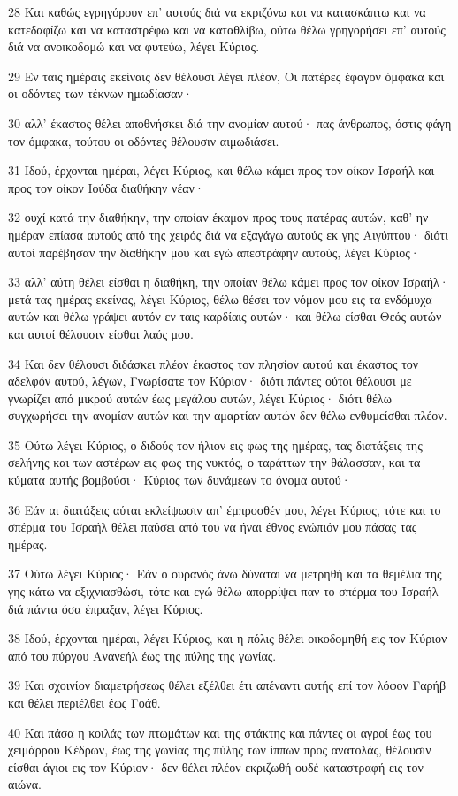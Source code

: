 \par 28 Και καθώς εγρηγόρουν επ' αυτούς διά να εκριζόνω και να κατασκάπτω και να κατεδαφίζω και να καταστρέφω και να καταθλίβω, ούτω θέλω γρηγορήσει επ' αυτούς διά να ανοικοδομώ και να φυτεύω, λέγει Κύριος.
\par 29 Εν ταις ημέραις εκείναις δεν θέλουσι λέγει πλέον, Οι πατέρες έφαγον όμφακα και οι οδόντες των τέκνων ημωδίασαν·
\par 30 αλλ' έκαστος θέλει αποθνήσκει διά την ανομίαν αυτού· πας άνθρωπος, όστις φάγη τον όμφακα, τούτου οι οδόντες θέλουσιν αιμωδιάσει.
\par 31 Ιδού, έρχονται ημέραι, λέγει Κύριος, και θέλω κάμει προς τον οίκον Ισραήλ και προς τον οίκον Ιούδα διαθήκην νέαν·
\par 32 ουχί κατά την διαθήκην, την οποίαν έκαμον προς τους πατέρας αυτών, καθ' ην ημέραν επίασα αυτούς από της χειρός διά να εξαγάγω αυτούς εκ γης Αιγύπτου· διότι αυτοί παρέβησαν την διαθήκην μου και εγώ απεστράφην αυτούς, λέγει Κύριος·
\par 33 αλλ' αύτη θέλει είσθαι η διαθήκη, την οποίαν θέλω κάμει προς τον οίκον Ισραήλ· μετά τας ημέρας εκείνας, λέγει Κύριος, θέλω θέσει τον νόμον μου εις τα ενδόμυχα αυτών και θέλω γράψει αυτόν εν ταις καρδίαις αυτών· και θέλω είσθαι Θεός αυτών και αυτοί θέλουσιν είσθαι λαός μου.
\par 34 Και δεν θέλουσι διδάσκει πλέον έκαστος τον πλησίον αυτού και έκαστος τον αδελφόν αυτού, λέγων, Γνωρίσατε τον Κύριον· διότι πάντες ούτοι θέλουσι με γνωρίζει από μικρού αυτών έως μεγάλου αυτών, λέγει Κύριος· διότι θέλω συγχωρήσει την ανομίαν αυτών και την αμαρτίαν αυτών δεν θέλω ενθυμείσθαι πλέον.
\par 35 Ούτω λέγει Κύριος, ο διδούς τον ήλιον εις φως της ημέρας, τας διατάξεις της σελήνης και των αστέρων εις φως της νυκτός, ο ταράττων την θάλασσαν, και τα κύματα αυτής βομβούσι· Κύριος των δυνάμεων το όνομα αυτού·
\par 36 Εάν αι διατάξεις αύται εκλείψωσιν απ' έμπροσθέν μου, λέγει Κύριος, τότε και το σπέρμα του Ισραήλ θέλει παύσει από του να ήναι έθνος ενώπιόν μου πάσας τας ημέρας.
\par 37 Ούτω λέγει Κύριος· Εάν ο ουρανός άνω δύναται να μετρηθή και τα θεμέλια της γης κάτω να εξιχνιασθώσι, τότε και εγώ θέλω απορρίψει παν το σπέρμα του Ισραήλ διά πάντα όσα έπραξαν, λέγει Κύριος.
\par 38 Ιδού, έρχονται ημέραι, λέγει Κύριος, και η πόλις θέλει οικοδομηθή εις τον Κύριον από του πύργου Ανανεήλ έως της πύλης της γωνίας.
\par 39 Και σχοινίον διαμετρήσεως θέλει εξέλθει έτι απέναντι αυτής επί τον λόφον Γαρήβ και θέλει περιέλθει έως Γοάθ.
\par 40 Και πάσα η κοιλάς των πτωμάτων και της στάκτης και πάντες οι αγροί έως του χειμάρρου Κέδρων, έως της γωνίας της πύλης των ίππων προς ανατολάς, θέλουσιν είσθαι άγιοι εις τον Κύριον· δεν θέλει πλέον εκριζωθή ουδέ καταστραφή εις τον αιώνα.

